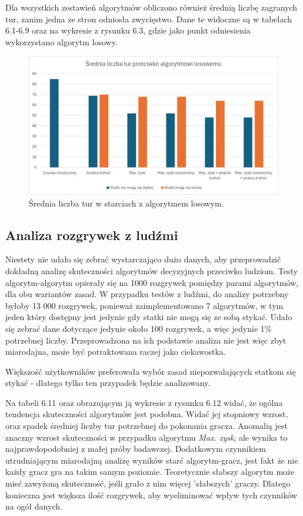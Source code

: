 Dla wszystkich zestawień algorytmów obliczono również średnią liczbę zagranych tur, zanim jedna ze stron odniosła zwycięstwo. Dane te widoczne są w tabelach 6.1-6.9 oraz na wykresie z rysunku 6.3, gdzie jako punkt odniesienia wykorzystano algorytm losowy.

\begin{figure}[!h]
    \label{fig:round-avg}
    \centering \includegraphics[width=0.9\linewidth]{img/round-count-avg.png}
    \caption{Średnia liczba tur w starciach z algorytmem losowym.}
\end{figure}


\subsection{Analiza rozgrywek z ludźmi}

Niestety nie udało się zebrać wystarczająco dużo danych, aby przeprowadzić dokładną analizę skuteczności algorytmów decyzyjnych przeciwko ludziom. Testy algorytm-algorytm opierały się na 1000 rozgrywek pomiędzy parami algorytmów, dla obu wariantów zasad. W przypadku testów z ludźmi, do analizy potrzebny byłoby 13 000 rozgrywek, ponieważ zaimplementowano 7 algorytmów, w tym jeden który dostępny jest jedynie gdy statki nie mogą się ze sobą stykać. Udało się zebrać dane dotyczące jedynie około 100 rozgrywek, a więc jedynie 1\% potrzebnej liczby. Przeprowadzona na ich podstawie analiza nie jest więc zbyt miarodajna, może być potraktowana raczej jako ciekawostka.

Większość użytkowników preferowała wybór zasad niepozwalających statkom się stykać - dlatego tylko ten przypadek będzie analizowany.

Na tabeli 6.11 oraz obrazującym ją wykresie z rysunku 6.12 widać, że ogólna tendencja skuteczności algorytmów jest podobna. Widać jej stopniowy wzrost, oraz spadek średniej liczby tur potrzebnej do pokonania gracza. Anomalią jest znaczny wzrost skuteczności w przypadku algorytmu \emph{Max. zysk}, ale wynika to najprawdopodobniej z małej próby badawczej. Dodatkowym czynnikiem utrudniającym miarodajną analizę wyników starć algorytm-gracz, jest fakt że nie każdy gracz gra na takim samym poziomie. Teoretycznie słabszy algorytm może mieć zawyżoną skuteczność, jeśli grało z nim  więcej 'słabszych' graczy. Dlatego konieczna jest większa ilość rozgrywek, aby wyeliminować wpływ tych czynników na ogół danych.

